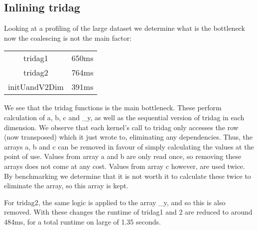 \subsection{Inlining tridag}
Looking at a profiling of the large dataset we determine what is the bottleneck now the coalescing is not the main factor:

\begin{tabular}{c|c}
    tridag1 & 650ms\\
    tridag2 & 764ms\\
    initUandV2Dim & 391ms
\end{tabular}

We see that the tridag functions is the main bottleneck. These perform calculation of a, b, c and _y, as well as the sequential version of tridag in each dimension. We observe that each kernel's call to tridag only accesses the row (now transposed) which it just wrote to, eliminating any dependencies. Thus, the arrays a, b and c can be removed in favour of simply calculating the values at the point of use. Values from array a and b are only read once, so removing these arrays does not come at any cost. Values from array c however, are used twice. By benchmarking we determine that it is not worth it to calculate these twice to eliminate the array, so this array is kept. 
\par For tridag2, the same logic is applied to the array _y, and so this is also removed. With these changes the runtime of tridag1 and 2 are reduced to around 484ms, for a total runtime on large of 1.35 seconds.
